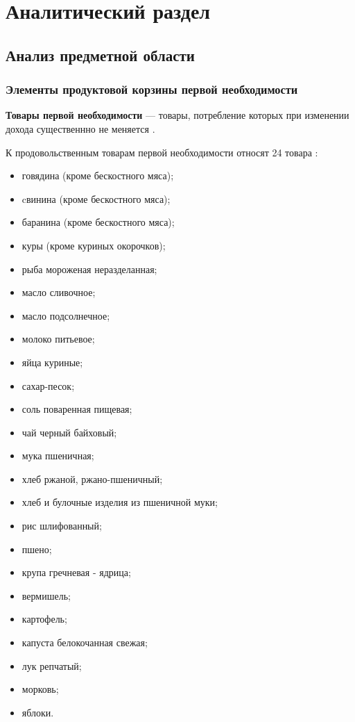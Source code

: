 \chapter{Аналитический раздел}

\section{Анализ предметной области}


\subsection{Элементы продуктовой корзины первой необходимости}

\textbf{Товары первой необходимости} --- товары, потребление которых при изменении дохода существеннно не меняется \cite{info_essential_goods}.

К продовольственным товарам первой необходимости относят 24 товара \cite{info_essential_goods2}:

\begin{itemize}[label=--]
	\item говядина (кроме бескостного мяса);
	\item cвинина (кроме бескостного мяса);
	\item баранина (кроме бескостного мяса);
	\item куры (кроме куриных окорочков);
	\item рыба мороженая неразделанная;
	\item масло сливочное;
	\item масло подсолнечное;
	\item молоко питьевое;
	\item яйца куриные;
	\item сахар-песок;
	\item соль поваренная пищевая;
	\item чай черный байховый;
	\item мука пшеничная;
	\item хлеб ржаной, ржано-пшеничный;
	\item хлеб и булочные изделия из пшеничной муки;
	\item рис шлифованный;
	\item пшено;
	\item крупа гречневая - ядрица;
	\item вермишель;
	\item картофель;
	\item капуста белокочанная свежая;
	\item лук репчатый;
	\item морковь;
	\item яблоки.
\end{itemize}

